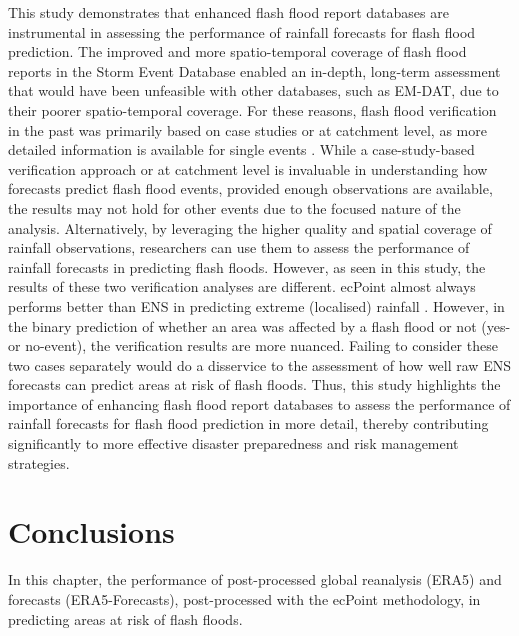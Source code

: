 This  study demonstrates that enhanced flash flood report databases are instrumental in assessing the performance of rainfall forecasts for flash flood prediction. The improved and more spatio-temporal coverage of flash flood reports in the Storm Event Database enabled an in-depth, long-term assessment that would have been unfeasible with other databases, such as EM-DAT, due to their poorer spatio-temporal coverage. For these reasons, flash flood verification in the past was primarily based on case studies or at catchment level, as more detailed information is available for single events \citep{Gaume_2009, Gaume_2016}. While a case-study-based verification approach or at catchment level is invaluable in understanding how forecasts predict flash flood events, provided enough observations are available, the results may not hold for other events due to the focused nature of the analysis. Alternatively, by leveraging the higher quality and spatial coverage of rainfall observations, researchers can use them to assess the performance of rainfall forecasts in predicting flash floods. However, as seen in this study, the results of these two verification analyses are different. ecPoint almost always performs better than ENS in predicting extreme (localised) rainfall \citep{Gascón_2024, Hemri_2022, Hewson_2021}. However, in the binary prediction of whether an area was affected by a flash flood or not (yes- or no-event), the verification results are more nuanced. Failing to consider these two cases separately would do a disservice to the assessment of how well raw ENS forecasts can predict areas at risk of flash floods. Thus, this study highlights the importance of enhancing flash flood report databases to assess the performance of rainfall forecasts for flash flood prediction in more detail, thereby contributing significantly to more effective disaster preparedness and risk management strategies.

\section{Conclusions}
\label{flash_flood_focused_verification_rainfall_based_ff_CONCLUSIONS}

In this chapter, the performance of post-processed global reanalysis (ERA5) and forecasts (ERA5-Forecasts), post-processed with the ecPoint methodology, in predicting areas at risk of flash floods. 

